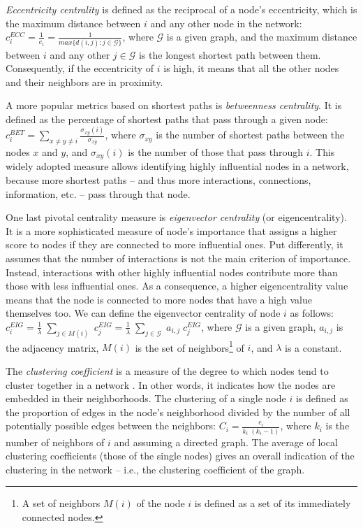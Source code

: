 \textit{Eccentricity centrality} is defined as the reciprocal of a node's eccentricity, which is the maximum distance between $i$ and any other node in the network: $c^{ECC}_{i} = \frac{1}{e_i} = \frac{1}{max\{d(i,j):j \in \mathcal{G}\}}$, where $\mathcal{G}$ is a given graph, and the maximum distance between $i$ and any other $j \in \mathcal{G}$ is the longest shortest path between them. Consequently, if the eccentricity of $i$ is high, it means that all the other nodes and their neighbors are in proximity.

A more popular metrics based on shortest paths is \textit{betweenness centrality}. It is defined as the percentage of shortest paths that pass through a given node: $c^{BET}_{i} = \sum_{x \ne y \ne i} \frac{\sigma_{xy}(i)}{\sigma_{xy}}$, where $\sigma_{xy}$ is the number of shortest paths between the nodes $x$ and $y$, and $\sigma_{xy}(i)$ is the number of those that pass through $i$. This widely adopted measure allows identifying highly influential nodes in a network, because more shortest paths – and thus more interactions, connections, information, etc. – pass through that node.

One last pivotal centrality measure is \textit{eigenvector centrality} (or eigencentrality). It is a more sophisticated measure of node's importance that assigns a higher score to nodes if they are connected to more influential ones. Put differently, it assumes that the number of interactions is not the main criterion of importance. Instead, interactions with other highly influential nodes contribute more than those with less influential ones. As a consequence, a higher eigencentrality value means that the node is connected to more nodes that have a high value themselves too. We can define the eigenvector centrality of node $i$ as follows: $c^{EIG}_{i} = \frac{1}{\lambda} \; \sum_{j \in M(i)} \; c^{EIG}_{j} = \frac{1}{\lambda} \; \sum_{j \in \mathcal{G}} \; a_{i,j} \; c^{EIG}_{j}$,
where $\mathcal{G}$ is a given graph, $a_{i,j}$ is the adjacency matrix, $M(i)$ is the set of neighbors\footnote{A set of neighbors $M(i)$ of the node $i$ is defined as a set of its immediately connected nodes.} of $i$, and $\lambda$ is a constant.

The \textit{clustering coefficient} is a measure of the degree to which nodes tend to cluster together in a network \citep{watts:1998}. In other words, it indicates how the nodes are embedded in their neighborhoods. The clustering of a single node $i$ is defined as the proportion of edges in the node's neighborhood divided by the number of all potentially possible edges between the neighbors: $C_i = \frac{e_i}{k_i \; (k_i - 1)}$, where $k_i$ is the number of neighbors of $i$ and assuming a directed graph. The average of local clustering coefficients (those of the single nodes) gives an overall indication of the clustering in the network – i.e., the clustering coefficient of the graph.

